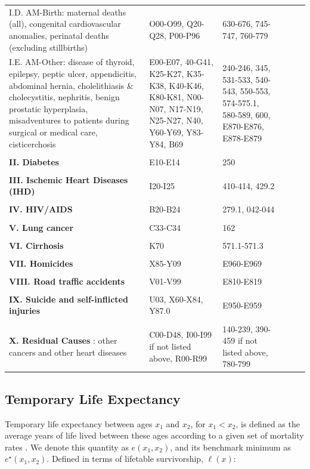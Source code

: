 \documentclass[11.5pt]{article}
\begin{document}
{\begin{longtable}{p{8cm}p{4cm}p{4cm}ccc}
          I.D. AM-Birth: maternal deaths (all), congenital cardiovascular anomalies, perinatal deaths (excluding stillbirths) & O00-O99, Q20-Q28, P00-P96 & 630-676, 745-747, 760-779\\
          I.E. AM-Other: disease of thyroid, epilepsy, peptic ulcer, appendicitis, abdominal hernia, cholelithiasis \& cholecystitis, nephritis, benign prostatic hyperplasia, misadventures to patients during surgical or medical care, cisticerchosis & E00-E07, 40-G41, K25-K27, K35-K38, K40-K46, K80-K81,  N00-N07, N17-N19, N25-N27, N40, Y60-Y69, Y83-Y84, B69 & 240-246, 345, 531-533, 540-543, 550-553, 574-575.1, 580-589, 600, E870-E876, E878-E879\\
 & \\          
 {\bf II. Diabetes}  & E10-E14 & 250 \\      
 & \\
 {\bf III. Ischemic Heart Diseases (IHD)}   & I20-I25 & 410-414, 429.2\\
 & \\           
 {\bf IV. HIV/AIDS} & B20-B24 & 279.1, 042-044\\ 
  & \\                
{\bf V. Lung cancer}  & C33-C34 & 162\\
  & \\          
{\bf VI. Cirrhosis}&  K70 & 571.1-571.3\\
 & \\          
{\bf VII. Homicides}  & X85-Y09 & E960-E969\\     
 & \\           
 {\bf VIII. Road traffic accidents}  & V01-V99 & E810-E819 \\     
 & \\           
{\bf IX. Suicide and self-inflicted injuries}  & U03, X60-X84, Y87.0 & E950-E959\\ 
 & \\          
{\bf X. Residual Causes }:  other cancers and other heart diseases & C00-D48, I00-I99 if not listed above, R00-R99 & 140-239, 390-459 if not listed above, 780-799
\label{ME_Mex}
\end{longtable}



\subsection*{Temporary Life Expectancy}
Temporary life expectancy between ages
$x_1$ and $x_2$, for $x_1<x_2$, is defined as the average years of life lived between these ages according to a given set of mortality rates \citep{arriaga1984}. We denote this quantity as
$e(x_1,x_2)$, and its benchmark minimum as $e^{\star}(x_1,x_2)$. Defined in
terms of lifetable survivorship, $\ell(x)$:

}
\end{document}

